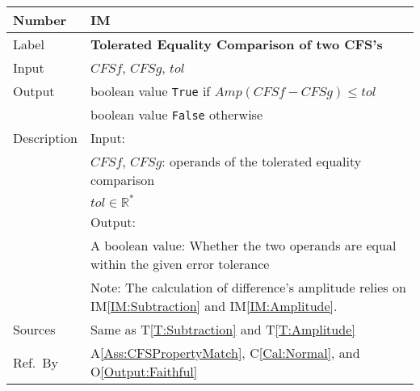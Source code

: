 \documentclass[12pt]{article}
\newcommand{\colAwidth}{0.13\textwidth}
\newcommand{\colBwidth}{0.82\textwidth}
\newcommand{\tref}[1]{T\ref{#1}}
\newcommand{\aref}[1]{A\ref{#1}}
\newcommand{\calref}[1]{C\ref{#1}}
\newcommand{\oref}[1]{O\ref{#1}}
\newcounter{instnum} %
\newcommand{\iref}[1]{IM\ref{#1}}
\begin{document}
\noindent
\begin{minipage}{\textwidth}
	\renewcommand*{\arraystretch}{1.5}
	\begin{tabular}{| p{\colAwidth} | p{\colBwidth}|}
		\hline
		\rowcolor[gray]{0.9}
		Number& IM{instnum}\theinstnum 
		\label{IM:ToleratedEquality}\\
		\hline
		Label& \bf Tolerated Equality Comparison of two CFS's \\
		\hline
		Input& $\mathit{CFSf}$, $\mathit{CFSg}$, $\mathit{tol}$\\
		\hline
		Output& boolean value \texttt{True} if 
		$\mathit{Amp}(\mathit{CFSf}-\mathit{CFSg})\leq \mathit{tol}$\\
		&boolean value \texttt{False} otherwise\\
		\hline
		Description&Input:\\
		&$\mathit{CFSf}$, $\mathit{CFSg}$: operands of 
		the tolerated equality comparison\\
		&$\mathit{tol}\in\mathbb{R}^{*}$\\
		&Output:\\
		& A boolean value: Whether the two operands are equal 
		within the given error tolerance\\
		&Note: The calculation of difference's amplitude 
		relies on \iref{IM:Subtraction} and \iref{IM:Amplitude}.\\
		\hline
		Sources&Same as \tref{T:Subtraction} and \tref{T:Amplitude}\\
		\hline
		Ref.\ By & \aref{Ass:CFSPropertyMatch}, \calref{Cal:Normal}, 
		and \oref{Output:Faithful}\\
		\hline
	\end{tabular}
\end{minipage}\\
~\newline
\end{document}
